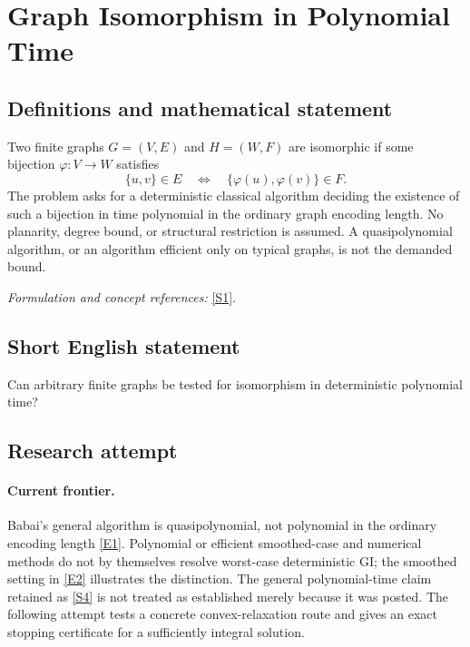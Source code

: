 \documentclass[11pt,a4paper]{article}
\numberwithin{equation}{section}
\newcommand{\sref}[2]{\hyperlink{source:#1:#2}{[S#2]}}
\newcommand{\eref}[2]{\hyperlink{extra:#1:#2}{[E#2]}}
\newif\ifshowcatalogue
\newcommand{\cataloguescope}[1]{\ifshowcatalogue
 \paragraph{Exact scope in the supplied catalogue.}
 \begin{quote}\small #1\end{quote}\fi}
\begin{document}
\setcounter{section}{0}
\section*{\texorpdfstring{Graph Isomorphism in Polynomial Time}{Graph Isomorphism in Polynomial Time}}\label{statement}
\subsection{Definitions and mathematical statement}
Two finite graphs $G=(V,E)$ and $H=(W,F)$ are isomorphic if some bijection $\varphi:V\to W$ satisfies
\[
 \{u,v\}\in E\quad\Longleftrightarrow\quad\{\varphi(u),\varphi(v)\}\in F.
\]
The problem asks for a deterministic classical algorithm deciding the existence of such a bijection in time polynomial in the ordinary graph encoding length. No planarity, degree bound, or structural restriction is assumed. A quasipolynomial algorithm, or an algorithm efficient only on typical graphs, is not the demanded bound.
\par\smallskip\textit{Formulation and concept references:} \sref{statement}{1}.
\cataloguescope{Determine whether the graph isomorphism problem for general finite graphs is decidable by a deterministic classical Turing machine in polynomial time.}
\subsection{Short English statement}
Can arbitrary finite graphs be tested for isomorphism in deterministic polynomial time?
\subsection{Research attempt}

\paragraph{Current frontier.}
Babai's general algorithm is quasipolynomial, not polynomial in the ordinary
encoding length \eref{statement}{1}. Polynomial or efficient smoothed-case and
numerical methods do not by themselves resolve worst-case deterministic
GI; the smoothed setting in \eref{statement}{2} illustrates the distinction.
The general polynomial-time claim retained as \sref{statement}{4} is not treated
as established merely because it was posted. The following attempt tests
a concrete convex-relaxation route and gives an exact stopping certificate
for a sufficiently integral solution.
\end{document}
